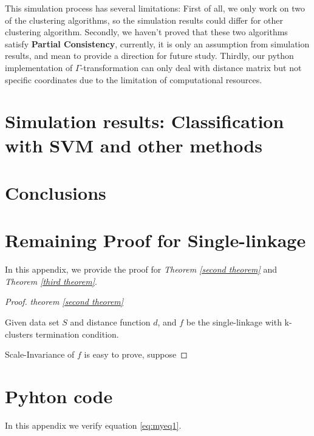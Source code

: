 \documentclass{uonmathreport}
\begin{document}
This simulation process has several limitations: First of all, we only work on two of the clustering algorithms, so the simulation results could differ for other clustering algorithm. Secondly, we haven't proved that these two algorithms satisfy \textbf{Partial Consistency}, currently, it is only an assumption from simulation results, and mean to provide a direction for future study. Thirdly, our python implementation of $\Gamma$-transformation can only deal with distance matrix but not specific coordinates due to the limitation of computational resources.

\section{Simulation results: Classification with SVM and other methods} \label{sec:Classification}










\section{Conclusions} \label{sec:conclusions}



\newpage

\appendix

\section{Remaining Proof for Single-linkage} \label{app:proof}
In this appendix, we provide the proof for \textit{Theorem \ref{second theorem}} and  \textit{Theorem \ref{third theorem}}.
\begin{proof}
\textit{theorem \ref{second theorem}}

\noindent Given data set $S$ and distance function $d$, and $f$ be the single-linkage with k-clusters termination condition. 

Scale-Invariance of $f$ is easy to prove, suppose 
\end{proof}

\section{ Pyhton code } \label{app:calculations}

In this appendix we verify equation \eqref{eq:myeq1}.

\newpage



\end{document}
